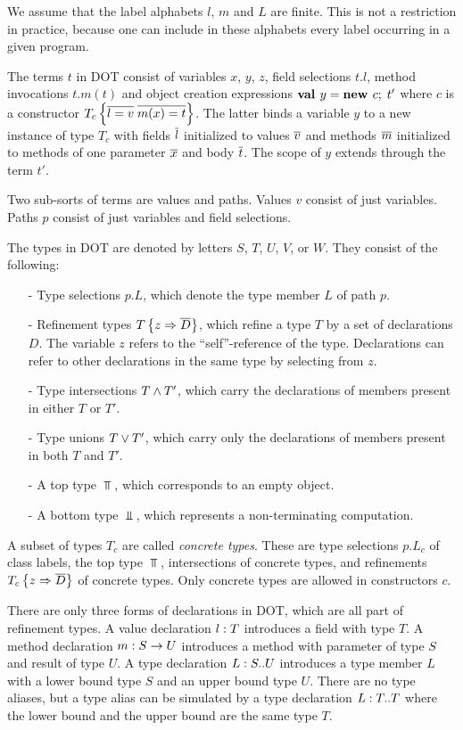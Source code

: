\documentclass[9pt]{sigplanconf}
\begin{document}
We assume that the label alphabets $l$, $m$ and $L$ are finite. This is
not a restriction in practice, because one can include in these 
alphabets every label occurring in a given program.

The terms $t$ in DOT consist of variables $x$, $y$, $z$, field
selections $t.l$, method invocations $t.m(t)$ and object creation
expressions $\textbf{val }y = \textbf{new }c ;\; t'$ where $c$ is a constructor $T_c \left\{\overline{l
    = v}\;\overline{m(x) = t}\right\}$. The latter binds a variable $y$ to a new
instance of type $T_c$ with fields $\overline{l}$ initialized to values
$\overline{v}$ and methods $\overline{m}$ initialized to methods of one parameter
$\overline{x}$ and body $\overline{t}$.  The scope of $y$ extends through the term
${t'}$.

Two sub-sorts of terms are values and paths. Values $v$ consist of
just variables. Paths $p$ consist of just variables and field
selections.

The types in DOT are denoted by letters $S$, $T$, $U$, $V$, or $W$. They consist of the following:
\begin{itemize}
\item[-] Type selections $p.L$, which denote the type member $L$ of path $p$.
\item[-] Refinement types $T \left\{z \Rightarrow \overline{D} \right\}$, which refine a type $T$ by a set of declarations $D$.
         The variable $z$ refers to the ``self''-reference of the type. Declarations can refer to
         other declarations in the same type by selecting from $z$.
\item[-] Type intersections $T \wedge T'$, which carry the declarations of members present in either $T$ or $T'$.
\item[-] Type unions $T \vee T'$, which carry only the declarations of members present in both $T$ and $T'$.
\item[-] A top type $\Top$, which corresponds to an empty object.
\item[-] A bottom type $\Bot$, which represents a non-terminating computation.
\end{itemize}
A subset of types $T_c$ are called {\em concrete types}. These are type selections
$p.L_c$ of class labels,
the top type $\Top$, intersections of concrete types, and refinements $T_c \left\{z \Rightarrow \overline{D} \right\}$ of concrete types. Only concrete types are allowed in constructors $c$.

There are only three forms of declarations in DOT, which are all part
of refinement types.  A value declaration $l : T$ introduces a
field with type $T$.  A method declaration $m : S \rightarrow U$ introduces a
method with parameter of type $S$ and result of type $U$. A type
declaration $L : S..U$ introduces a type member $L$ with a lower
bound type $S$ and an upper bound type $U$. There are no type aliases,
but a type alias can be simulated by a type declaration $L : T..T$
where the lower bound and the upper bound are the same type $T$.
\end{document}
